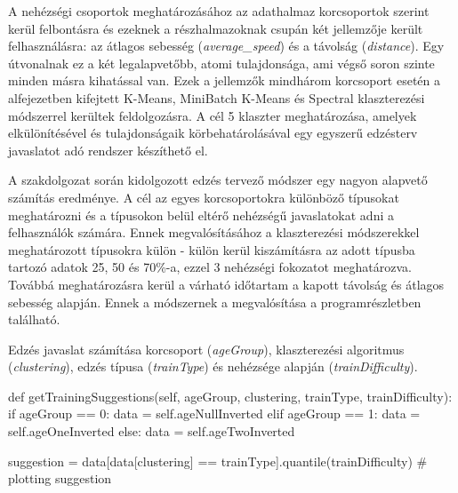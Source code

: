 A nehézségi csoportok meghatározásához az adathalmaz korcsoportok szerint  kerül felbontásra és ezeknek a részhalmazoknak csupán két jellemzője került felhasználásra: az átlagos sebesség (\textit{average\_speed}) és a távolság (\textit{distance}). Egy útvonalnak ez a két legalapvetőbb, atomi tulajdonsága, ami végső soron szinte minden másra kihatással van. Ezek a jellemzők mindhárom korcsoport esetén a  alfejezetben kifejtett K-Means, MiniBatch K-Means és Spectral klaszterezési módszerrel kerültek feldolgozásra. A cél 5 klaszter meghatározása, amelyek elkülönítésével és tulajdonságaik körbehatárolásával egy egyszerű edzésterv javaslatot adó rendszer készíthető el. 

A szakdolgozat során kidolgozott edzés tervező módszer egy nagyon alapvető számítás eredménye. A cél az egyes korcsoportokra különböző típusokat meghatározni és a típusokon belül eltérő nehézségű javaslatokat adni a felhasználók számára. Ennek megvalósításához a klaszterezési módszerekkel meghatározott típusokra külön - külön kerül kiszámításra az adott típusba tartozó adatok 25, 50 és 70\%-a, ezzel 3 nehézségi fokozatot meghatározva. Továbbá meghatározásra kerül a várható időtartam a kapott távolság és átlagos sebesség alapján. Ennek a módszernek a megvalósítása a  programrészletben található.
\begin{programreszlet} Edzés javaslat számítása korcsoport (\textit{ageGroup}), klaszterezési algoritmus (\textit{clustering}), edzés típusa (\textit{trainType}) és nehézsége alapján (\textit{trainDifficulty}).
\begin{python}
def getTrainingSuggestions(self, ageGroup, clustering, trainType, 
			   trainDifficulty):
    if ageGroup == 0:
        data = self.ageNullInverted
    elif ageGroup == 1:
        data = self.ageOneInverted
    else:
        data = self.ageTwoInverted
        
    suggestion = data[data[clustering] == 
    		      trainType].quantile(trainDifficulty)
    # plotting suggestion
\end{python}
\label{prog:getTrainingSuggestion}
\end{programreszlet}
	

